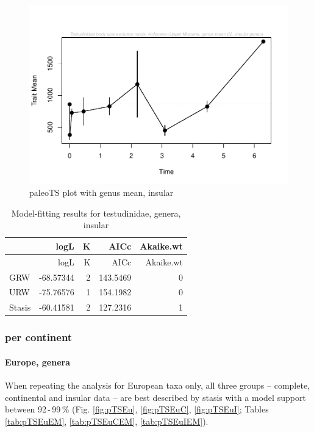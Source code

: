 \begin{figure}[H]
	\centering
	\includegraphics{MA_JJ_files/figure-latex/paleoTSI-1.pdf}
	\caption{paleoTS plot with genus mean, insular}
	\label{fig:pTSI}
\end{figure}

\begin{longtable}[]{@{}lrrrr@{}}
	\caption{Model-fitting results for testudinidae, genera,
		insular}
	\label{tab:pTSIEM}\tabularnewline
	\toprule
	& logL & K & AICc & Akaike.wt\tabularnewline
	\midrule
	\endfirsthead
	\toprule
	& logL & K & AICc & Akaike.wt\tabularnewline
	\midrule
	\endhead
	GRW & -68.57344 & 2 & 143.5469 & 0\tabularnewline
	URW & -75.76576 & 1 & 154.1982 & 0\tabularnewline
	Stasis & -60.41581 & 2 & 127.2316 & 1\tabularnewline
	\bottomrule
\end{longtable}

\FloatBarrier

\subsubsection{per continent}\label{per-continent}

\paragraph{Europe, genera}\label{europe-genera}

When repeating the analysis for European taxa only, all three groups -- complete, continental and insular data -- are best described by stasis with a model support between 92\,-\,99\,\% (Fig. \ref{fig:pTSEu}, \ref{fig:pTSEuC}, \ref{fig:pTSEuI}; Tables \ref{tab:pTSEuEM}, \ref{tab:pTSEuCEM}, \ref{tab:pTSEuIEM}).

